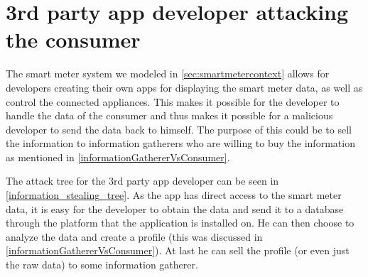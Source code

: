 \section{3rd party app developer attacking the consumer}\label{3rdpartyattacktree}
The smart meter system we modeled in \cref{sec:smartmetercontext} allows for developers creating their own apps for displaying the smart meter data, as well as control the connected appliances.
This makes it possible for the developer to handle the data of the consumer and thus makes it possible for a malicious developer to send the data back to himself.
The purpose of this could be to sell the information to information gatherers who are willing to buy the information as mentioned in \cref{informationGathererVsConsumer}.

The attack tree for the 3rd party app developer can be seen in \cref{information_stealing_tree}.
As the app has direct access to the smart meter data, it is easy for the developer to obtain the data and send it to a database through the platform that the application is installed on.
He can then choose to analyze the data and create a profile (this was discussed in \cref{informationGathererVsConsumer}).
At last he can sell the profile (or even just the raw data) to some information gatherer.


